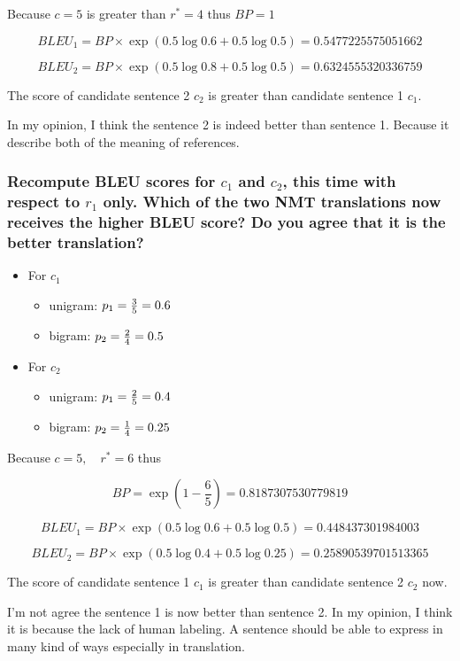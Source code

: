 \documentclass[12pt, letterpaper]{article}
\begin{document}
Because $c = 5$ is greater than $r^* = 4$ thus $BP = 1$

$$
BLEU_1 = BP \times \exp(0.5 \log 0.6 + 0.5 \log 0.5) = 0.5477225575051662
$$

$$
BLEU_2 = BP \times \exp(0.5 \log 0.8 + 0.5 \log 0.5) = 0.6324555320336759
$$

The score of candidate sentence 2 $c_2$ is greater than candidate sentence 1 $c_1$.

In my opinion, I think the sentence 2 is indeed better than sentence 1. Because it describe both of the meaning of references.

\subsubsection{Recompute BLEU scores for $c_1$ and $c_2$, this time with respect to $r_1$ only. Which of the two NMT translations now receives the higher BLEU score? Do you agree that it is the better translation?}

\begin{itemize}[topsep=0pt, partopsep=0pt]
  \item For $c_1$ {
    \begin{itemize}
      \item unigram: $p_1 = {3 \over 5} = 0.6$
      \item bigram: $p_2 = {2 \over 4} = 0.5$
    \end{itemize}
  }
  \item For $c_2$ {
    \begin{itemize}
      \item unigram: $p_1 = {2 \over 5} = 0.4$
      \item bigram: $p_2 = {1 \over 4} = 0.25$
    \end{itemize}
  }
\end{itemize}

Because $c = 5,\quad r^* = 6$ thus

$$
BP = \exp(1 - \frac{6}{5}) = 0.8187307530779819
$$

$$
BLEU_1 = BP \times \exp(0.5 \log 0.6 + 0.5 \log 0.5) = 0.448437301984003
$$

$$
BLEU_2 = BP \times \exp(0.5 \log 0.4 + 0.5 \log 0.25) = 0.25890539701513365
$$

The score of candidate sentence 1 $c_1$ is greater than candidate sentence 2 $c_2$ now.

I'm not agree the sentence 1 is now better than sentence 2. In my opinion, I think it is because the lack of human labeling. A sentence should be able to express in many kind of ways especially in translation.
\end{document}
